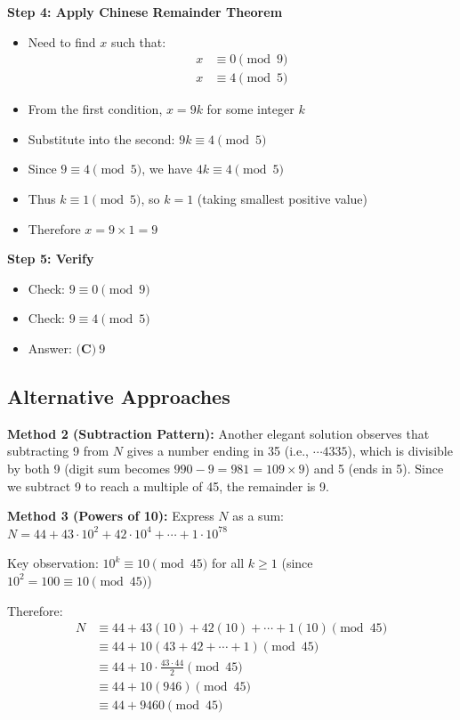 \documentclass[11pt]{article}
\begin{document}
\begin{solutionbox}
\textbf{Step 4: Apply Chinese Remainder Theorem}
\begin{itemize}
    \item Need to find $x$ such that:
    \begin{align*}
        x &\equiv 0 \pmod{9}\\
        x &\equiv 4 \pmod{5}
    \end{align*}
    \item From the first condition, $x = 9k$ for some integer $k$
    \item Substitute into the second: $9k \equiv 4 \pmod{5}$
    \item Since $9 \equiv 4 \pmod{5}$, we have $4k \equiv 4 \pmod{5}$
    \item Thus $k \equiv 1 \pmod{5}$, so $k = 1$ (taking smallest positive value)
    \item Therefore $x = 9 \times 1 = 9$
\end{itemize}

\textbf{Step 5: Verify}
\begin{itemize}
    \item Check: $9 \equiv 0 \pmod{9}$ \checkmark
    \item Check: $9 \equiv 4 \pmod{5}$ \checkmark
    \item Answer: $\boxed{\textbf{(C)}\ 9}$
\end{itemize}

\subsection*{Alternative Approaches}

\textbf{Method 2 (Subtraction Pattern):}
Another elegant solution observes that subtracting 9 from $N$ gives a number ending in 35 (i.e., $\cdots 4335$), which is divisible by both 9 (digit sum becomes $990 - 9 = 981 = 109 \times 9$) and 5 (ends in 5). Since we subtract 9 to reach a multiple of 45, the remainder is 9.

\textbf{Method 3 (Powers of 10):}
Express $N$ as a sum: $N = 44 + 43 \cdot 10^2 + 42 \cdot 10^4 + \cdots + 1 \cdot 10^{78}$

Key observation: $10^k \equiv 10 \pmod{45}$ for all $k \geq 1$ (since $10^2 = 100 \equiv 10 \pmod{45}$)

Therefore:
\begin{align*}
N &\equiv 44 + 43(10) + 42(10) + \cdots + 1(10) \pmod{45}\\
&\equiv 44 + 10(43 + 42 + \cdots + 1) \pmod{45}\\
&\equiv 44 + 10 \cdot \frac{43 \cdot 44}{2} \pmod{45}\\
&\equiv 44 + 10(946) \pmod{45}\\
&\equiv 44 + 9460 \pmod{45}
\end{align*}


\end{solutionbox}
\end{document}
